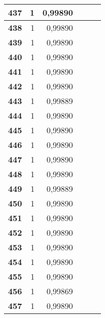 {\begin{longtable}{|r|r|r|l|r|r|}
\textbf{437} & 1 & 0,99890 &  & \multicolumn{1}{l|}{} & \multicolumn{1}{l|}{} \\ \hline
\textbf{438} & 1 & 0,99890 &  & \multicolumn{1}{l|}{} & \multicolumn{1}{l|}{} \\ \hline
\textbf{439} & 1 & 0,99890 &  & \multicolumn{1}{l|}{} & \multicolumn{1}{l|}{} \\ \hline
\textbf{440} & 1 & 0,99890 &  & \multicolumn{1}{l|}{} & \multicolumn{1}{l|}{} \\ \hline
\textbf{441} & 1 & 0,99890 &  & \multicolumn{1}{l|}{} & \multicolumn{1}{l|}{} \\ \hline
\textbf{442} & 1 & 0,99890 &  & \multicolumn{1}{l|}{} & \multicolumn{1}{l|}{} \\ \hline
\textbf{443} & 1 & 0,99889 &  & \multicolumn{1}{l|}{} & \multicolumn{1}{l|}{} \\ \hline
\textbf{444} & 1 & 0,99890 &  & \multicolumn{1}{l|}{} & \multicolumn{1}{l|}{} \\ \hline
\textbf{445} & 1 & 0,99890 &  & \multicolumn{1}{l|}{} & \multicolumn{1}{l|}{} \\ \hline
\textbf{446} & 1 & 0,99890 &  & \multicolumn{1}{l|}{} & \multicolumn{1}{l|}{} \\ \hline
\textbf{447} & 1 & 0,99890 &  & \multicolumn{1}{l|}{} & \multicolumn{1}{l|}{} \\ \hline
\textbf{448} & 1 & 0,99890 &  & \multicolumn{1}{l|}{} & \multicolumn{1}{l|}{} \\ \hline
\textbf{449} & 1 & 0,99889 &  & \multicolumn{1}{l|}{} & \multicolumn{1}{l|}{} \\ \hline
\textbf{450} & 1 & 0,99890 &  & \multicolumn{1}{l|}{} & \multicolumn{1}{l|}{} \\ \hline
\textbf{451} & 1 & 0,99890 &  & \multicolumn{1}{l|}{} & \multicolumn{1}{l|}{} \\ \hline
\textbf{452} & 1 & 0,99890 &  & \multicolumn{1}{l|}{} & \multicolumn{1}{l|}{} \\ \hline
\textbf{453} & 1 & 0,99890 &  & \multicolumn{1}{l|}{} & \multicolumn{1}{l|}{} \\ \hline
\textbf{454} & 1 & 0,99890 &  & \multicolumn{1}{l|}{} & \multicolumn{1}{l|}{} \\ \hline
\textbf{455} & 1 & 0,99890 &  & \multicolumn{1}{l|}{} & \multicolumn{1}{l|}{} \\ \hline
\textbf{456} & 1 & 0,99869 &  & \multicolumn{1}{l|}{} & \multicolumn{1}{l|}{} \\ \hline
\textbf{457} & 1 & 0,99890 &  & \multicolumn{1}{l|}{} & \multicolumn{1}{l|}{} \\ \hline

\end{longtable}}
